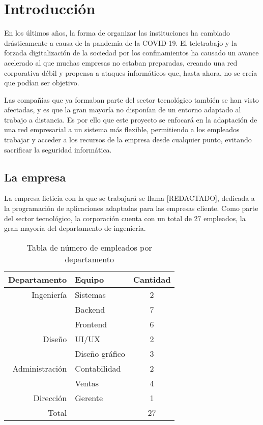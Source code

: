 \chapter{Introducción}
\label{chapter:introduction}

En los últimos años, la forma de organizar las instituciones ha cambiado drásticamente a causa de la pandemia de la COVID-19. El teletrabajo y la forzada digitalización de la sociedad por los confinamientos ha causado un avance acelerado al que muchas empresas no estaban preparadas, creando una red corporativa débil y propensa a ataques informáticos que, hasta ahora, no se creía que podían ser objetivo. 

Las compañías que ya formaban parte del sector tecnológico también se han visto afectadas, y es que la gran mayoría no disponían de un entorno adaptado al trabajo a distancia. Es por ello que este proyecto se enfocará en la adaptación de una red empresarial a un sistema más flexible, permitiendo a los empleados trabajar y acceder a los recursos de la empresa desde cualquier punto, evitando sacrificar la seguridad informática.
\section{La empresa}
La empresa ficticia con la que se trabajará se llama [REDACTADO], dedicada a la programación de aplicaciones adaptadas para las empresas cliente. Como parte del sector tecnológico, la corporación cuenta con un total de 27 empleados, la gran mayoría del departamento de ingeniería. 

\begin{table}[h!]
\centering
\begin{tabularx}{300pt}{|r|X|c|}
\hline
Departamento   & Equipo         & Cantidad \\ \hline
Ingeniería     & Sistemas       & 2        \\
               & Backend        & 7        \\
               & Frontend       & 6        \\ \hline
Diseño         & UI/UX          & 2        \\
               & Diseño gráfico & 3        \\ \hline
Administración & Contabilidad   & 2        \\
               & Ventas         & 4        \\
Dirección      & Gerente        & 1        \\ \hline
Total          &                & 27       \\ \hline
\end{tabularx}
\label{tab:tabla_personal}
\caption{Tabla de número de empleados por departamento}
\end{table}

